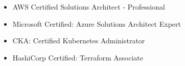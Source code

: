 \documentclass{resume}
\begin{document}



\begin{body}
	\begin{itemize}[noitemsep,topsep=0pt]
		\item AWS Certified Solutions Architect - Professional
		\item Microsoft Certified: Azure Solutions Architect Expert
		\item CKA: Certified Kubernetes Administrator
		\item HashiCorp Certified: Terraform Associate
	\end{itemize}
\end{body}


\end{document}
